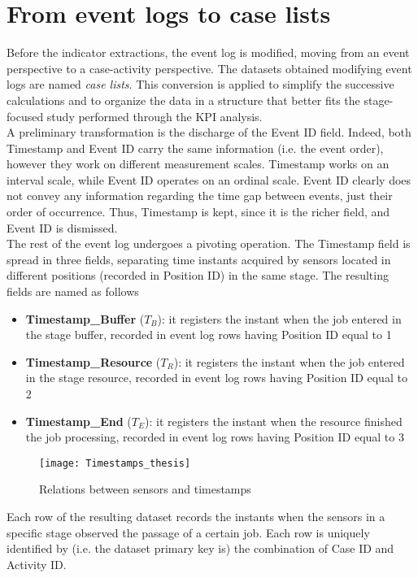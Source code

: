 \section{From event logs to case lists}
\label{From event logs to case lists}
Before the indicator extractions, the event log is modified, moving from an event perspective to a case-activity perspective. The datasets obtained modifying event logs are named \textit{case lists}. This conversion is applied to simplify the successive calculations and to organize the data in a structure that better fits the stage-focused study performed through the KPI analysis. \\
A preliminary transformation is the discharge of the Event ID field. Indeed, both Timestamp and Event ID carry the same information (i.e. the event order), however they work on different measurement scales. Timestamp works on an interval scale, while Event ID operates on an ordinal scale. Event ID clearly does not convey any information regarding the time gap between events, just their order of occurrence. Thus, Timestamp is kept, since it is the richer field, and Event ID is dismissed. \\ 
The rest of the event log undergoes a pivoting operation. The Timestamp field is spread in three fields, separating time instants acquired by sensors located in different positions (recorded in Position ID) in the same stage. The resulting fields are named as follows
\begin{itemize}
\item \textbf{Timestamp\_Buffer} ($T_B$): it registers the instant when the job entered in the stage buffer, recorded in event log rows having Position ID equal to 1
\item \textbf{Timestamp\_Resource} ($T_R$): it registers the instant when the job entered in the stage resource, recorded in event log rows having Position ID equal to 2
\item \textbf{Timestamp\_End} ($T_E$): it registers the instant when the resource finished the job processing, recorded in event log rows having Position ID equal to 3
\end{itemize}
\begin{figure}[h] 
\centering    
\texttt{[image: Timestamps\_thesis]}
\caption[Relations between sensors and timestamps]{Relations between sensors and timestamps}
\label{fig:Relations between sensors and timestamps}
\end{figure}
Each row of the resulting dataset records the instants when the sensors in a specific stage observed the passage of a certain job. Each row is uniquely identified by (i.e. the dataset primary key is) the combination of Case ID and Activity ID. \\
